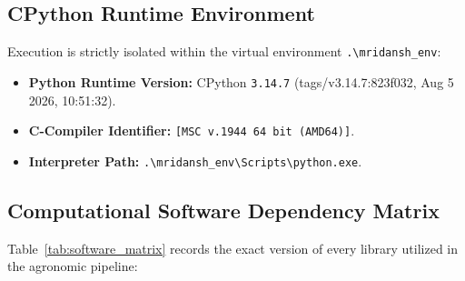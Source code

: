 \documentclass[11pt,a4paper]{article}
\theoremstyle{definition}
\theoremstyle{remark}
\begin{document}
\subsection{CPython Runtime Environment}
Execution is strictly isolated within the virtual environment \texttt{.\textbackslash mridansh\_env}:
\begin{itemize}
    \item \textbf{Python Runtime Version:} CPython \texttt{3.14.7} (tags/v3.14.7:823f032, Aug 5 2026, 10:51:32).
    \item \textbf{C-Compiler Identifier:} \texttt{[MSC v.1944 64 bit (AMD64)]}.
    \item \textbf{Interpreter Path:} \texttt{.\textbackslash mridansh\_env\textbackslash Scripts\textbackslash python.exe}.
\end{itemize}

\subsection{Computational Software Dependency Matrix}
Table~\ref{tab:software_matrix} records the exact version of every library utilized in the agronomic pipeline:
\end{document}

